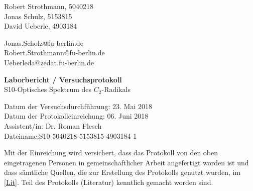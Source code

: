 %


%
\thispagestyle{empty}

\begin{flushleft}
Robert Strothmann, 5040218\\ 
Jonas Schulz, 5153815\\ 
David Ueberle, 4903184\\ 
\end{flushleft}
\vspace*{0.3cm}
Jonas.Scholz@fu-berlin.de\\
Robert.Strothmann@fu-berlin.de\\
Ueberleda@zedat.fu-berlin.de\\
\begin{center}
	\vspace*{1cm}
	\Large
	{ \bfseries Laborbericht / Versuchsprotokoll}\\
	\vspace*{1cm}
	{S10-Optisches Spektrum des $C_2$-Radikals}\\
\end{center}
	\vspace*{1cm}
	{Datum der Versuchsdurchführung: 23. Mai 2018}\\
	{Datum der Protokolleinreichung:  06. Juni 2018}\\
	{Assistent/in: Dr. Roman Flesch}\\
	{Dateiname:S10-5040218-5153815-4903184-1}	
	\vfill
\begin{flushleft}
Mit der Einreichung wird versichert, dass das Protokoll von den oben eingetragenen Personen in gemeinschaftlicher Arbeit angefertigt worden ist und dass sämtliche Quellen, die zur Erstellung des Protokolls genutzt wurden, im \ref{Lit}. Teil des Protokolls (Literatur) kenntlich gemacht worden sind.
\end{flushleft}

\normalsize
\newpage
%
